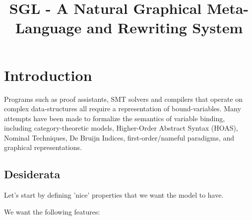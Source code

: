 \documentclass[]{lipics-v2021}
\title{SGL - A Natural Graphical Meta-Language and Rewriting System}
\begin{document}
\maketitle

\section{Introduction}
Programs such as proof assistants, SMT solvers and compilers that operate on
complex data-structures all require a representation of bound-variables. Many
attempts have been made to formalize the semantics of variable binding,
including category-theoretic models, Higher-Order Abstract Syntax (HOAS),
Nominal Techniques, De Bruijn Indices, first-order/nameful paradigms, and
graphical representations.

\subsection{Desiderata}
Let's start by defining 'nice' properties that we want the model to have.

We want the following features:

\end{document}
